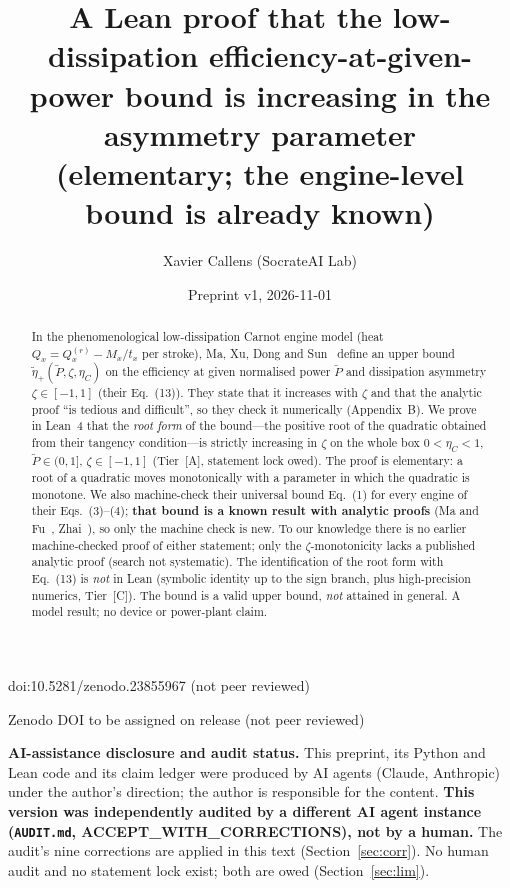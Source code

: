 \documentclass[10pt]{article}
\title{A Lean proof that the low-dissipation efficiency-at-given-power bound is increasing in the asymmetry parameter\\
{\large (elementary; the engine-level bound is already known)}}
\author{Xavier Callens (SocrateAI Lab)}
\date{Preprint v1, 2026-11-01}
\newcommand{\tier}[1]{\textsf{[#1]}}
\newcommand{\tA}{\tier{A}}
\newcommand{\tC}{\tier{C}}
\newcommand{\eC}{\eta_C}
\newcommand{\ep}{\tilde\eta_+}
\theoremstyle{plain}
\begin{document}
\maketitle
\begin{center}\small doi:10.5281/zenodo.23855967 \quad (not peer reviewed)\end{center}

\begin{center}\small Zenodo DOI to be assigned on release \quad (not peer reviewed)\end{center}

\noindent\textbf{AI-assistance disclosure and audit status.} This preprint, its Python and Lean code and its claim ledger were
produced by AI agents (Claude, Anthropic) under the author's direction; the author is responsible for the content.
\textbf{This version was independently audited by a different AI agent instance (\texttt{AUDIT.md}, ACCEPT\_WITH\_CORRECTIONS), not by a human.}
The audit's nine corrections are applied in this text (Section~\ref{sec:corr}). No human audit and no statement lock exist; both are owed (Section~\ref{sec:lim}).

\begin{abstract}
In the phenomenological low-dissipation Carnot engine model (heat $Q_x=Q_x^{(r)}-M_x/t_x$ per stroke), Ma, Xu, Dong and Sun~\cite{ma18} define an upper bound $\ep(\tilde P,\zeta,\eC)$ on the efficiency at given normalised power $\tilde P$ and dissipation asymmetry $\zeta\in[-1,1]$ (their Eq.~(13)). They state that it increases with $\zeta$ and that the analytic proof ``is tedious and difficult'', so they check it numerically (Appendix~B). We prove in Lean~4 that the \emph{root form} of the bound---the positive root of the quadratic obtained from their tangency condition---is strictly increasing in $\zeta$ on the whole box $0<\eC<1$, $\tilde P\in(0,1]$, $\zeta\in[-1,1]$ (Tier~\tA{}, statement lock owed). The proof is elementary: a root of a quadratic moves monotonically with a parameter in which the quadratic is monotone. We also machine-check their universal bound Eq.~(1) for every engine of their Eqs.~(3)--(4); \textbf{that bound is a known result with analytic proofs} (Ma and Fu~\cite{mafu}, Zhai~\cite{zhai}), so only the machine check is new. To our knowledge there is no earlier machine-checked proof of either statement; only the $\zeta$-monotonicity lacks a published analytic proof (search not systematic). The identification of the root form with Eq.~(13) is \emph{not} in Lean (symbolic identity up to the sign branch, plus high-precision numerics, Tier~\tC{}). The bound is a valid upper bound, \emph{not} attained in general. A model result; no device or power-plant claim.
\end{abstract}
\end{document}
